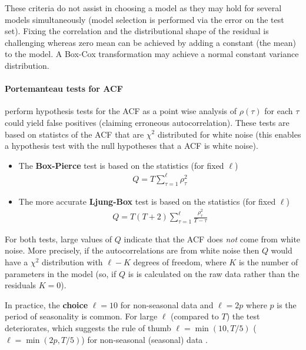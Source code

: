 \documentclass[12pt,a4paper]{article}
\begin{document}
These criteria do not assist in choosing a model as they may hold for several models simultaneously (model selection is performed via the error on the test set).  Fixing the correlation and the distributional shape of the residual is challenging whereas zero mean can be achieved by adding a constant (the mean) to the model. A Box-Cox transformation may achieve a normal constant variance distribution. 


\paragraph{Portemanteau tests for ACF} perform  hypothesis tests for the ACF as a point wise analysis of $\rho(\tau)$ for each $\tau$ could yield false positives (claiming erroneous autocorrelation).  These tests are based on statistcs of the ACF that are $\chi^2$ distributed for white noise (this enables a hypothesis test with the null hypotheses that a ACF is white noise).
\begin{itemize}
	
\item  The \textbf{Box-Pierce} test is based on the statistics (for fixed $\ell$)
\begin{align}
	Q = T \sum _{\tau=1}^\ell\rho_\tau^2
\end{align}

\item The more accurate \textbf{Ljung-Box} test is based on the statistics (for fixed $\ell$)
\begin{align}
Q = T (T+2) \sum _{\tau=1}^\ell\frac{\rho_\tau^2}{T-\tau}
\end{align}

\end{itemize}

For both tests, large values of $Q$ indicate that the ACF does \textit{not} come from white noise. More precisely, if the autocorrelations are from white noise then $Q$ would have a $\chi^2$ distribution with $\ell - K$ degrees of freedom, where $K$ is the number of parameters in the model (so, if $Q$ is is calculated on the raw data rather than the residuals $K=0$). 

 In practice, the \textbf{choice} $\ell=10$ for non-seasonal data and $\ell=2p$ where $p$ is the period of seasonality is common. For large $\ell$ (compared to $T$) the test deteriorates, which suggests the rule of thumb $\ell=\min(10, T/5)$ ($\ell=\min(2p, T/5)$) for non-seasonal (seasonal) data \cite{hyndman_forecasting_principles_2018}.
\end{document}
